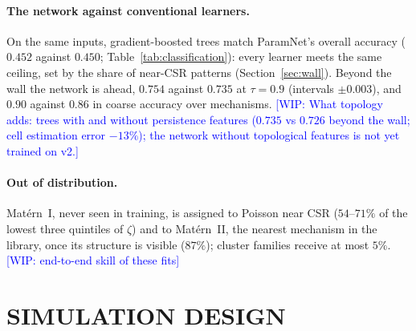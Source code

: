 \documentclass[twoside]{article}
\newcommand{\WIP}[1]{\textcolor{blue}{[WIP: #1]}}
\begin{document}
\begin{table}[t]
\caption{Balanced accuracy over the eight families on the $192\,000$ test patterns, overall and beyond the wall
($\tau=0.5$, $0.9$; Section~\ref{sec:wall}); intervals are within $\pm0.003$. Coarse: accuracy over mechanisms (CSR,
clustered, regular, cell) beyond the wall at $\tau=0.9$. Minimum contrast: penalized-contrast selection.}
\label{tab:classification}
\begin{center}
\footnotesize
\setlength{\tabcolsep}{4pt}

\end{center}
\end{table}

\paragraph{The network against conventional learners.} On the same inputs, gradient-boosted trees match ParamNet's
overall accuracy ($0.452$ against $0.450$; Table~\ref{tab:classification}): every learner meets the same ceiling, set
by the share of near-CSR patterns (Section~\ref{sec:wall}). Beyond the wall the network is ahead, $0.754$ against
$0.735$ at $\tau=0.9$ (intervals $\pm0.003$), and $0.90$ against $0.86$ in coarse accuracy over mechanisms.
\WIP{What topology adds: trees with and without persistence features ($0.735$ vs $0.726$ beyond the wall; cell
estimation error $-13\%$); the network without topological features is not yet trained on v2.}

\paragraph{Out of distribution.} Mat\'ern~I, never seen in training, is assigned to Poisson near CSR ($54$--$71\%$ of
the lowest three quintiles of $\zeta$) and to Mat\'ern~II, the nearest mechanism in the library, once its structure is
visible ($87\%$); cluster families receive at most $5\%$. \WIP{end-to-end skill of these fits}



\clearpage
\appendix
\onecolumn
{}

\section{SIMULATION DESIGN}
\label{app:data}
\end{document}

